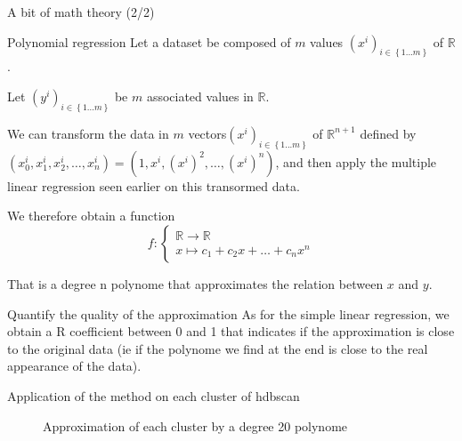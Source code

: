 \begin{frame}{A bit of math theory (2/2)}
    \begin{block}{Polynomial regression}
        Let a dataset be composed of $m$ values $\ensuremath{\left(x^{i}\right)_{i\in\left\{ 1...m\right\} }}$ of $\mathbb{R}$. 

        Let $\ensuremath{\left(y^{i}\right)_{i\in\left\{ 1...m\right\}}}$ be $m$ associated values in $\mathbb{R}$.

        We can transform the data in $m$ vectors$\ensuremath{\left(x^{i}\right)_{i\in\left\{ 1...m\right\}}}$
        of $\mathbb{R}^{n+1}$ defined by $(x_{0}^{i},x_{1}^{i},x_{2}^{i},\dots,x_{n}^{i})=(1,x^{i},(x^{i})^{2},\dots,(x^{i})^{n})$, 
        and then apply the multiple linear regression seen earlier on this transormed data.
        
        We therefore obtain a function 
        \[
            f:\begin{cases}
            \mathbb{R}\rightarrow\mathbb{R}\\
            x\mapsto c_{1}+c_{2}x+\dots+c_{n}x^{n}
            \end{cases}
        \]
        
        That is a degree n polynome that approximates the relation between $x$ and $y$.
    \end{block}

    \begin{block}{Quantify the quality of the approximation}
        As for the simple linear regression, we obtain a R coefficient between 0 and 1 that indicates if the approximation is close to the original data 
        (ie if the polynome we find at the end is close to the real appearance of the data).
    \end{block}
\end{frame}

\begin{frame}{Application of the method on each cluster of hdbscan}
    \begin{figure}
        \caption{Approximation of each cluster by a degree 20 polynome}
    \end{figure}
\end{frame}

